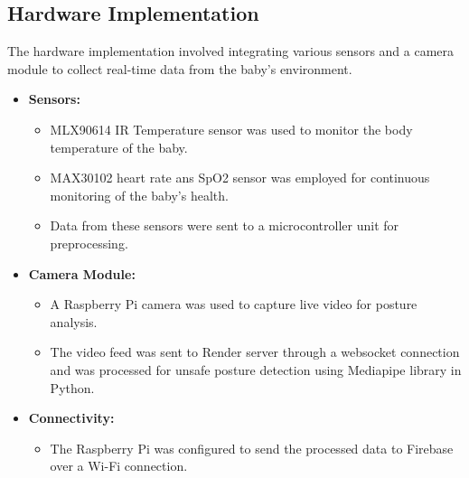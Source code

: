 \documentclass[conference]{IEEEtran}
\begin{document}
\subsection{Hardware Implementation}
The hardware implementation involved integrating various sensors and a camera module to collect real-time data from the baby's environment.
\begin{itemize}
  \item \textbf{Sensors:}
  \begin{itemize}
    \item MLX90614 IR Temperature sensor was used to monitor the body temperature of the baby.
    \item MAX30102 heart rate ans SpO2 sensor was employed for continuous monitoring of the baby’s health.
    \item Data from these sensors were sent to a microcontroller unit for preprocessing.
  \end{itemize}
  \item \textbf{Camera Module:}
  \begin{itemize}
    \item A Raspberry Pi camera was used to capture live video for posture analysis.
    \item The video feed was sent to Render server through a websocket connection and was processed for unsafe posture detection using Mediapipe library in Python.
  \end{itemize}
  \item \textbf{Connectivity:}
  \begin{itemize}
    \item The Raspberry Pi was configured to send the processed data to Firebase over a Wi-Fi connection.
  \end{itemize}
\end{itemize}
\end{document}

